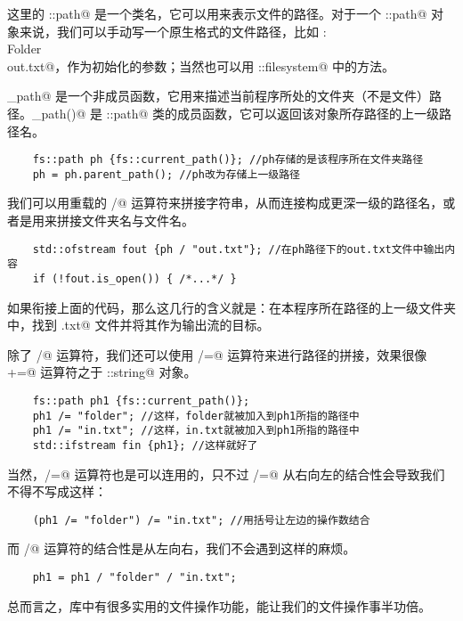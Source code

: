 这里的 \lstinline@fs::path@ 是一个类名，它可以用来表示文件的路径。对于一个 \lstinline@fs::path@ 对象来说，我们可以手动写一个原生格式的文件路径，比如 \lstinline@D:\\Folder\\out.txt@，作为初始化的参数；当然也可以用 \lstinline@std::filesystem@ 中的方法。\par
\lstinline@current_path@ 是一个非成员函数，它用来描述当前程序所处的文件夹（不是文件）路径。\lstinline@parent_path()@ 是 \lstinline@fs::path@ 类的成员函数，它可以返回该对象所存路径的上一级路径名。
\begin{lstlisting}
    fs::path ph {fs::current_path()}; //ph存储的是该程序所在文件夹路径
    ph = ph.parent_path(); //ph改为存储上一级路径
\end{lstlisting}
我们可以用重载的 \lstinline@/@ 运算符来拼接字符串，从而连接构成更深一级的路径名，或者是用来拼接文件夹名与文件名。
\begin{lstlisting}
    std::ofstream fout {ph / "out.txt"}; //在ph路径下的out.txt文件中输出内容
    if (!fout.is_open()) { /*...*/ }
\end{lstlisting}
如果衔接上面的代码，那么这几行的含义就是：在本程序所在路径的上一级文件夹中，找到 \lstinline@out.txt@ 文件并将其作为输出流的目标。\par
除了 \lstinline@/@ 运算符，我们还可以使用 \lstinline@/=@ 运算符来进行路径的拼接，效果很像 \lstinline@+=@ 运算符之于 \lstinline@std::string@ 对象。\par
\begin{lstlisting}
    fs::path ph1 {fs::current_path()};
    ph1 /= "folder"; //这样，folder就被加入到ph1所指的路径中
    ph1 /= "in.txt"; //这样，in.txt就被加入到ph1所指的路径中
    std::ifstream fin {ph1}; //这样就好了
\end{lstlisting}
当然，\lstinline@/=@ 运算符也是可以连用的，只不过 \lstinline@/=@ 从右向左的结合性会导致我们不得不写成这样：
\begin{lstlisting}
    (ph1 /= "folder") /= "in.txt"; //用括号让左边的操作数结合
\end{lstlisting}
而 \lstinline@/@ 运算符的结合性是从左向右，我们不会遇到这样的麻烦。
\begin{lstlisting}
    ph1 = ph1 / "folder" / "in.txt";
\end{lstlisting}\par
总而言之，\lstinline@filesystem@ 库中有很多实用的文件操作功能，能让我们的文件操作事半功倍。\par
